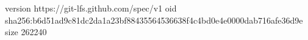 version https://git-lfs.github.com/spec/v1
oid sha256:b6d51ad9c81dc2da1a23bf88435564536638f4c4bd0e4e0000dab716afe36d9e
size 262240
